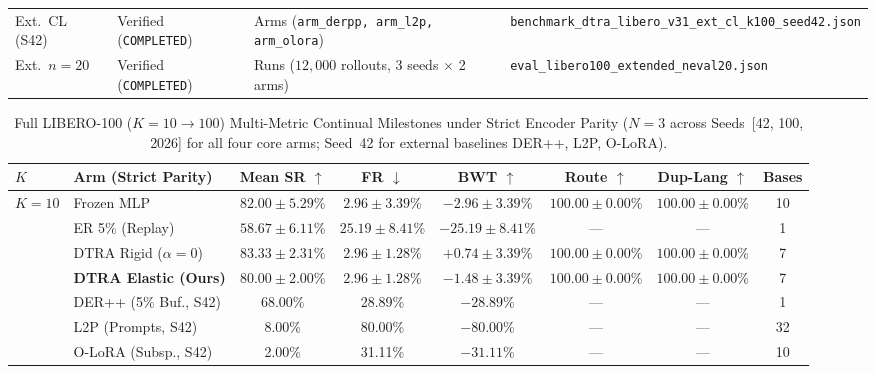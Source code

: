 \documentclass[10pt]{article}
\begin{document}
\begin{table}[ht!]
\begin{tabular}{>{\raggedright\arraybackslash}p{}>{\raggedright\arraybackslash}p{}>{\raggedright\arraybackslash}p{}>{\raggedright\arraybackslash}p{}}
    Ext.~CL (S42) & Verified (\texttt{COMPLETED}) & 3 Arms (\texttt{arm\_\allowbreak derpp, arm\_\allowbreak l2p, arm\_\allowbreak olora}) & \texttt{benchmark\_\allowbreak dtra\_\allowbreak libero\_\allowbreak v31\_\allowbreak ext\_\allowbreak cl\_\allowbreak k100\_\allowbreak seed42.json} \\
    Ext.~$n=20$ & Verified (\texttt{COMPLETED}) & 6 Runs ($12{,}000$ rollouts, 3 seeds $\times$ 2 arms) & \texttt{eval\_\allowbreak libero100\_\allowbreak extended\_\allowbreak neval20.json} \\
    \bottomrule
  \end{tabular}
\end{table}


\begin{table}[ht!]
  \centering
  \caption{Full LIBERO-100 ($K=10 \to 100$) Multi-Metric Continual Milestones under Strict Encoder Parity ($N=3$ across Seeds~[42, 100, 2026] for all four core arms; Seed~42 for external baselines DER++, L2P, O-LoRA).}
  \label{tab:libero100_milestones}
  \fontsize{8.0pt}{9.8pt}\selectfont
  \setlength{\tabcolsep}{2.5pt}
  \begin{tabular}{llcccccc}
    \toprule
    \textbf{$K$} & \textbf{Arm (Strict Parity)} & \textbf{Mean SR $\uparrow$} & \textbf{FR $\downarrow$} & \textbf{BWT $\uparrow$} & \textbf{Route $\uparrow$} & \textbf{Dup-Lang $\uparrow$} & \textbf{Bases} \\
    \midrule
    $K=10$ & Frozen MLP & $82.00 \pm 5.29$\% & $2.96 \pm 3.39$\% & $-2.96 \pm 3.39$\% & $\mathbf{100.00 \pm 0.00}$\% & $\mathbf{100.00 \pm 0.00}$\% & 10 \\
     & ER 5\% (Replay) & $58.67 \pm 6.11$\% & $25.19 \pm 8.41$\% & $-25.19 \pm 8.41$\% & --- & --- & 1 \\
     & DTRA Rigid ($\alpha=0$) & $\mathbf{83.33 \pm 2.31}$\% & $2.96 \pm 1.28$\% & $+0.74 \pm 3.39$\% & $\mathbf{100.00 \pm 0.00}$\% & $\mathbf{100.00 \pm 0.00}$\% & 7 \\
     & \textbf{DTRA Elastic (Ours)} & $80.00 \pm 2.00$\% & $2.96 \pm 1.28$\% & $-1.48 \pm 3.39$\% & $\mathbf{100.00 \pm 0.00}$\% & $\mathbf{100.00 \pm 0.00}$\% & 7 \\
    & DER++ (5\% Buf., S42) & 68.00\% & 28.89\% & $-28.89$\% & --- & --- & 1 \\
    & L2P (Prompts, S42) & 8.00\% & 80.00\% & $-80.00$\% & --- & --- & 32 \\
    & O-LoRA (Subsp., S42) & 2.00\% & 31.11\% & $-31.11$\% & --- & --- & 10 \\
    \midrule

\end{tabular}
\end{table}
\end{document}
